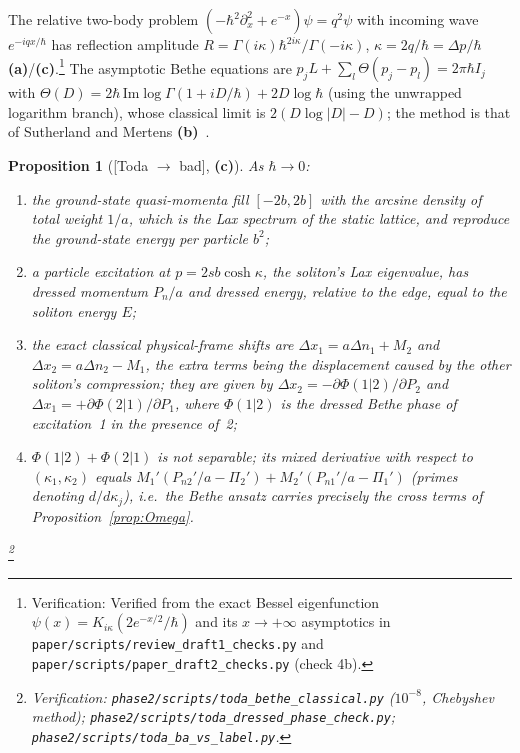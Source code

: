 \documentclass[11pt,a4paper]{article}
\newcommand{\lab}[1]{{\normalfont\sffamily\footnotesize\bfseries(#1)}}
\newcommand{\La}{\lab{a}}
\newcommand{\Lb}{\lab{b}}
\newcommand{\Lc}{\lab{c}}
\newcommand{\eqtag}[2]{{\normalfont\sffamily\footnotesize\textcolor{#1}{[#2]}}}
\newcommand{\scr}[1]{\nolinkurl{#1}}
\newcommand{\chk}[1]{\footnote{\raggedright Verification: #1.}}
\newcommand{\hb}{\hbar}
\newtheorem{proposition}{Proposition}[section]
\theoremstyle{remark}
\begin{document}
The relative two-body problem $(-\hb^2\partial_x^2+e^{-x})\psi=q^2\psi$ with incoming wave $e^{-iqx/\hb}$ has reflection amplitude $R=\Gamma(i\kappa)\hb^{2i\kappa}/\Gamma(-i\kappa)$, $\kappa=2q/\hb=\Delta p/\hb$ \La/\Lc.\chk{Verified from the exact Bessel eigenfunction $\psi(x)=K_{i\kappa}(2e^{-x/2}/\hb)$ and its $x\to+\infty$ asymptotics in \scr{paper/scripts/review_draft1_checks.py} and \scr{paper/scripts/paper_draft2_checks.py} (check 4b)} The asymptotic Bethe equations are $p_jL+\sum_l\Theta(p_j-p_l)=2\pi\hb I_j$ with $\Theta(D)=2\hb\,\mathrm{Im}\log\Gamma(1+iD/\hb)+2D\log\hb$ (using the unwrapped logarithm branch), whose classical limit is $2(D\log|D|-D)$; the method is that of Sutherland and Mertens \Lb~\cite{Sutherland,Mertens}.

\begin{proposition}[\eqtag{red!60!black}{Toda $\to$ bad}, \Lc]\label{prop:todaBA}
As $\hb\to0$:
\begin{enumerate}
\item the ground-state quasi-momenta fill $[-2b,2b]$ with the arcsine density of total weight $1/a$, which is the Lax spectrum of the static lattice, and reproduce the ground-state energy per particle $b^2$;
\item a particle excitation at $p=2sb\cosh\kappa$, the soliton's Lax eigenvalue, has dressed momentum $P_n/a$ and dressed energy, relative to the edge, equal to the soliton energy $E$;
\item the exact classical physical-frame shifts are $\Delta x_1=a\Delta n_1+M_2$ and $\Delta x_2=a\Delta n_2-M_1$, the extra terms being the displacement caused by the other soliton's compression; they are given by $\Delta x_2=-\partial\Phi(1|2)/\partial P_2$ and $\Delta x_1=+\partial\Phi(2|1)/\partial P_1$, where $\Phi(1|2)$ is the dressed Bethe phase of excitation~1 in the presence of~2;
\item $\Phi(1|2)+\Phi(2|1)$ is not separable; its mixed derivative with respect to $(\kappa_1,\kappa_2)$ equals $M_1'(P_{n2}'/a-\Pi_2')+M_2'(P_{n1}'/a-\Pi_1')$ (primes denoting $d/d\kappa_j$), i.e.\ the Bethe ansatz carries precisely the cross terms of Proposition~\ref{prop:Omega}.
\end{enumerate}
\chk{\scr{phase2/scripts/toda_bethe_classical.py} ($10^{-8}$, Chebyshev method); \scr{phase2/scripts/toda_dressed_phase_check.py}; \scr{phase2/scripts/toda_ba_vs_label.py}}
\end{proposition}
\end{document}
